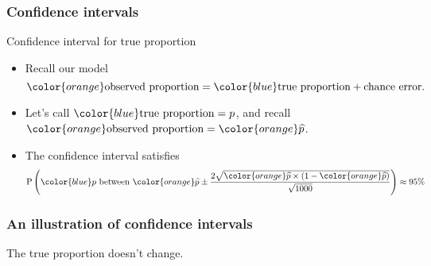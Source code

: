 \documentclass[handout]{beamer}
\begin{document}

   \begin{frame} \frametitle{Confidence intervals}

   \begin{block}
   {Confidence interval for true proportion}
   \begin{itemize}
   \item Recall our model
   $$
   {\color{orange} \text{observed proportion}} = {\color{blue} \text{true proportion}} + \text{chance error}.
   $$
   \item Let's call ${\color{blue} \text{true proportion}=p}$, and recall
   ${\color{orange} \text{observed proportion}} = {\color{orange} \widehat{p}}$.
   \item The confidence interval satisfies
   $$
   \begin{aligned}
   \text{P} \left(\text{${\color{blue} p}$ between ${\color{orange} \widehat{p}} \pm \frac{2\sqrt{{\color{orange} \widehat{p}} \times (1-{\color{orange} \widehat{p}})}}{\sqrt{1000}}$}\right) &\approx 95\% \\
   \end{aligned}
   $$

   \end{itemize}
   \end{block}
   \end{frame}



   \begin{frame}
   \frametitle{An illustration of confidence intervals}
   \begin{center}
   \end{center}
   The {\color{blue} true proportion} doesn't change.
   \end{frame}
\end{document}
